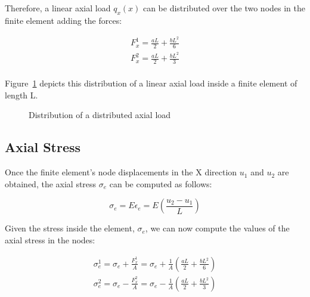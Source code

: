 Therefore, a linear axial load $q_x(x)$ can be distributed over the two nodes in the finite element adding the forces:

\begin{equation}
  \begin{split}
    F_x^1 = \frac{a L}{2} + \frac{b L^2}{6} \\
    F_x^2 = \frac{a L}{2} + \frac{b L^2}{3} \\
  \end{split}
\end{equation}

Figure~\ref{fig:axial_finite_element_load_distribution} depicts this distribution of a linear axial load inside a finite element of length L.

\begin{figure}[h]
  \label{fig:axial_finite_element_load_distribution}
  \centering
  \caption{Distribution of a distributed axial load}
\end{figure}


\subsection{Axial Stress}

Once the finite element's node displacements in the X direction $u_1$ and $u_2$ are obtained, the axial stress $\sigma_e$ can be computed as follows:

\[
  \sigma_e = E \epsilon_e = E \left( \frac{u_2 - u_1}{L} \right)
\]

Given the stress inside the element, $\sigma_e$, we can now compute the values of the axial stress in the nodes:

\[
  \begin{split}
    \sigma_e^1 = \sigma_e + \frac{F_x^1}{A} = \sigma_e + \frac{1}{A} \left( \frac{a L}{2} + \frac{b L^2}{6} \right) \\
    \sigma_e^2 = \sigma_e - \frac{F_x^2}{A} = \sigma_e - \frac{1}{A} \left( \frac{a L}{2} + \frac{b L^2}{3} \right) \\
  \end{split}
\]

